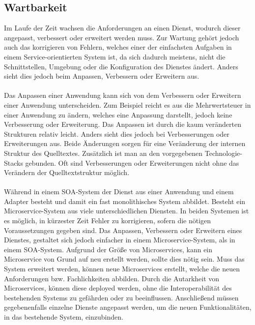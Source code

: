 \subsection{Wartbarkeit}
\label{subsec:Wartbarkeit}
Im Laufe der Zeit wachsen die Anforderungen an einen Dienst, wodurch dieser angepasst, verbessert oder erweitert werden muss. Zur Wartung gehört jedoch auch das korrigieren von Fehlern, welches einer der einfachsten Aufgaben in einem Service-orientierten System ist, da sich dadurch meistens, nicht die Schnittstellen, Umgebung oder die Konfiguration des Dienstes ändert. Anders sieht dies jedoch beim Anpassen, Verbessern oder Erweitern aus.
\\\\
Das Anpassen einer Anwendung kann sich von dem Verbessern oder Erweitern einer Anwendung unterscheiden. Zum Beispiel reicht es aus die Mehrwertsteuer in einer Anwendung zu ändern, welches eine Anpassung darstellt, jedoch keine Verbesserung oder Erweiterung. Das Anpassen ist durch die kaum veränderten Strukturen relativ leicht. Anders sieht dies jedoch bei Verbesserungen oder Erweiterungen aus. Beide Änderungen sorgen für eine Veränderung der internen Struktur des Quelltextes. Zusätzlich ist man an den vorgegebenen Technologie-Stacks gebunden. Oft sind Verbesserungen oder Erweiterungen nicht ohne das Verändern der Quelltextstruktur möglich.
\\\\
Während in einem SOA-System der Dienst aus einer Anwendung und einem Adapter besteht und damit ein fast monolithisches System abbildet. Besteht ein Microservice-System aus viele unterschiedlichen Diensten. In beiden Systemen ist es möglich, in kürzester Zeit Fehler zu korrigieren, sofern die nötigen Voraussetzungen gegeben sind. Das Anpassen, Verbessern oder Erweitern eines Dienstes, gestaltet sich jedoch einfacher in einem Microservice-System, als in einem SOA-System. Aufgrund der Größe von Microservices, kann ein Microservice von Grund auf neu erstellt werden, sollte dies nötig sein. Muss das System erweitert werden, können neue Microservices erstellt, welche die neuen Anforderungen bzw. Fachlichkeiten abbilden. Durch die Autarkheit von Microservices, können diese deployed werden, ohne die Interoperabilität des bestehenden Systems zu gefährden oder zu beeinflussen. Anschließend müssen gegebenenfalls einzelne Dienste angepasst werden, um die neuen Funktionalitäten, in das bestehende System, einzubinden.

